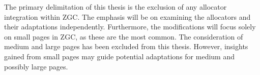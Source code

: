 The primary delimitation of this thesis is the exclusion of any allocator integration within ZGC. The emphasis will be on examining the allocators and their adaptations independently. Furthermore, the modifications will focus solely on small pages in ZGC, as these are the most common. The consideration of medium and large pages has been excluded from this thesis. However, insights gained from small pages may guide potential adaptations for medium and possibly large pages.

